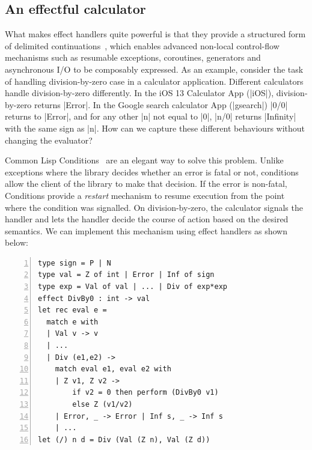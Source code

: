 \documentclass[sigplan,10pt,review,anonymous]{acmart}\settopmatter{printfolios=true,printccs=false,printacmref=false}
\begin{document}
\subsection{An effectful calculator}

What makes effect handlers quite powerful is that they provide a structured
form of delimited continuations~\cite{}, which enables advanced non-local
control-flow mechanisms such as resumable exceptions, coroutines, generators
and asynchronous I/O to be composably expressed. As an example, consider the
task of handling division-by-zero case in a calculator application. Different
calculators handle division-by-zero differently. In the iOS 13 Calculator App
(|iOS|), division-by-zero returns |Error|. In the Google search calculator App
(|gsearch|) |0/0| returns to |Error|, and for any other |n| not equal to |0|,
|n/0| returns |Infinity| with the same sign as |n|. How can we capture these
different behaviours without changing the evaluator?

Common Lisp Conditions~\cite{Conditions} are an elegant way to solve this
problem. Unlike exceptions where the library decides whether an error is fatal
or not, conditions allow the client of the library to make that decision. If
the error is non-fatal, Conditions provide a \emph{restart} mechanism to resume
execution from the point where the condition was signalled. On
division-by-zero, the calculator signals the handler and lets the handler
decide the course of action based on the desired semantics. We can implement
this mechanism using effect handlers as shown below:

\begin{lstlisting}[numbers=left]
type sign = P | N
type val = Z of int | Error | Inf of sign
type exp = Val of val | ... | Div of exp*exp
effect DivBy0 : int -> val
let rec eval e =
  match e with
  | Val v -> v
  | ...
  | Div (e1,e2) ->
    match eval e1, eval e2 with
    | Z v1, Z v2 ->
        if v2 = 0 then perform (DivBy0 v1)
        else Z (v1/v2)
    | Error, _ -> Error | Inf s, _ -> Inf s
    | ...
let (/) n d = Div (Val (Z n), Val (Z d))
\end{lstlisting}
\end{document}
